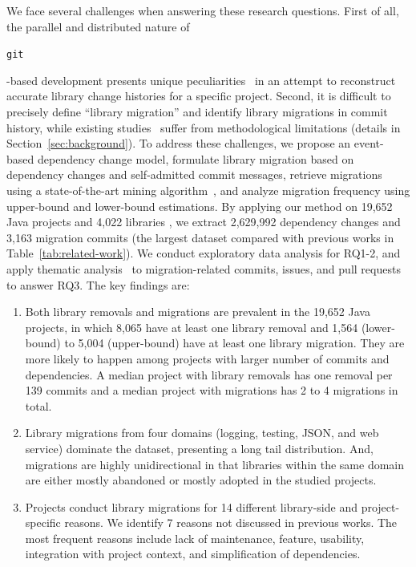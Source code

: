 \documentclass[sigconf, screen]{acmart}
\newcommand{\Code}[1]{\begin{small}\texttt{#1}\end{small}}
\begin{document}
We face several challenges when answering these research questions.
First of all, the parallel and distributed nature of \Code{git}-based development presents unique peculiarities~\cite{bird2009promises} in an attempt to reconstruct accurate library change histories for a specific project.
Second, it is difficult to precisely define ``library migration'' and identify library migrations in commit history, while existing studies~\cite{teyton2012mining, teyton2014study} suffer from methodological limitations (details in Section~\ref{sec:background}).
To address these challenges, we propose an event-based dependency change model, formulate library migration based on dependency changes and self-admitted commit messages, retrieve migrations using a state-of-the-art mining algorithm~\cite{he2021multi}, and analyze migration frequency using upper-bound and lower-bound estimations.
By applying our method on 19,652 %
Java projects and 4,022 libraries%
, we extract 2,629,992 dependency changes and 3,163 migration commits (the largest dataset compared with previous works in Table~\ref{tab:related-work}). 
We conduct exploratory data analysis for RQ1-2, and apply thematic analysis~\cite{cruzes2011recommended, braun2012thematic} to migration-related commits, issues, and pull requests to answer RQ3.
The key findings are:  %
\begin{enumerate}
    \item Both library removals and migrations are prevalent in the 19,652 Java projects, in which 8,065 have at least one library removal and 1,564 (lower-bound) to 5,004 (upper-bound) have at least one library migration. They are more likely to happen among projects with larger number of commits and dependencies. A median project with library removals has one removal per 139 commits and a median project with migrations has 2 to 4 migrations in total.
    \item Library migrations from four domains (logging, testing, JSON, and web service) dominate the dataset, presenting a long tail distribution. And, migrations are highly unidirectional in that libraries within the same domain are either mostly abandoned or mostly adopted in the studied projects.
    \item Projects conduct library migrations for 14 different library-side and project-specific reasons. We identify 7 reasons not discussed in previous works. The most frequent reasons include lack of maintenance, feature, usability, integration with project context, and simplification of dependencies.
\end{enumerate}
\end{document}
